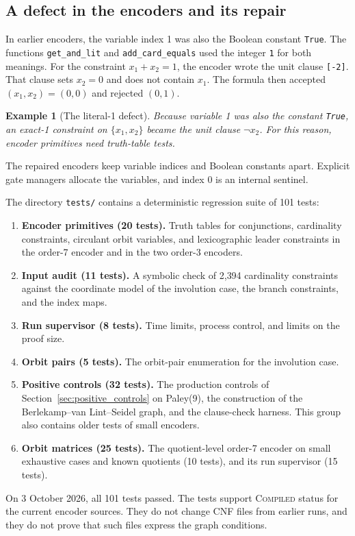 \documentclass[pdflatex,sn-mathphys-num]{sn-jnl}
\theoremstyle{thmstyleone}
\theoremstyle{thmstyletwo}
\newtheorem{example}[theorem]{Example}
\theoremstyle{thmstylethree}
\numberwithin{equation}{section}
\begin{document}
\subsection{A defect in the encoders and its repair}

In earlier encoders, the variable index 1 was also the Boolean constant \texttt{True}.
The functions \texttt{get\_and\_lit} and \texttt{add\_card\_equals} used the integer \texttt{1} for both meanings.
For the constraint $x_1 + x_2 = 1$, the encoder wrote the unit clause \texttt{[-2]}.
That clause sets $x_2 = 0$ and does not contain $x_1$.
The formula then accepted $(x_1, x_2) = (0, 0)$ and rejected $(0, 1)$.
\begin{example}[The literal-1 defect]
\label{ex:literal1}
Because variable 1 was also the constant \texttt{True}, an exact-1 constraint on $\{x_1, x_2\}$ became the unit clause $\neg x_2$. For this reason, encoder primitives need truth-table tests.
\end{example}
The repaired encoders keep variable indices and Boolean constants apart. Explicit gate managers allocate the variables, and index 0 is an internal sentinel.

The directory \texttt{tests/} contains a deterministic regression suite of 101 tests:
\begin{enumerate}
 \item \textbf{Encoder primitives (20 tests).} Truth tables for conjunctions, cardinality constraints, circulant orbit variables, and lexicographic leader constraints in the order-7 encoder and in the two order-3 encoders.
 \item \textbf{Input audit (11 tests).} A symbolic check of 2{,}394 cardinality constraints against the coordinate model of the involution case, the branch constraints, and the index maps.
 \item \textbf{Run supervisor (8 tests).} Time limits, process control, and limits on the proof size.
 \item \textbf{Orbit pairs (5 tests).} The orbit-pair enumeration for the involution case.
 \item \textbf{Positive controls (32 tests).} The production controls of Section~\ref{sec:positive_controls} on Paley(9), the construction of the Berlekamp--van Lint--Seidel graph, and the clause-check harness. This group also contains older tests of small encoders.
 \item \textbf{Orbit matrices (25 tests).} The quotient-level order-7 encoder on small exhaustive cases and known quotients (10 tests), and its run supervisor (15 tests).
\end{enumerate}
On 3 October 2026, all 101 tests passed. The tests support \textsc{Compiled} status for the current encoder sources. They do not change CNF files from earlier runs, and they do not prove that such files express the graph conditions.
\end{document}
